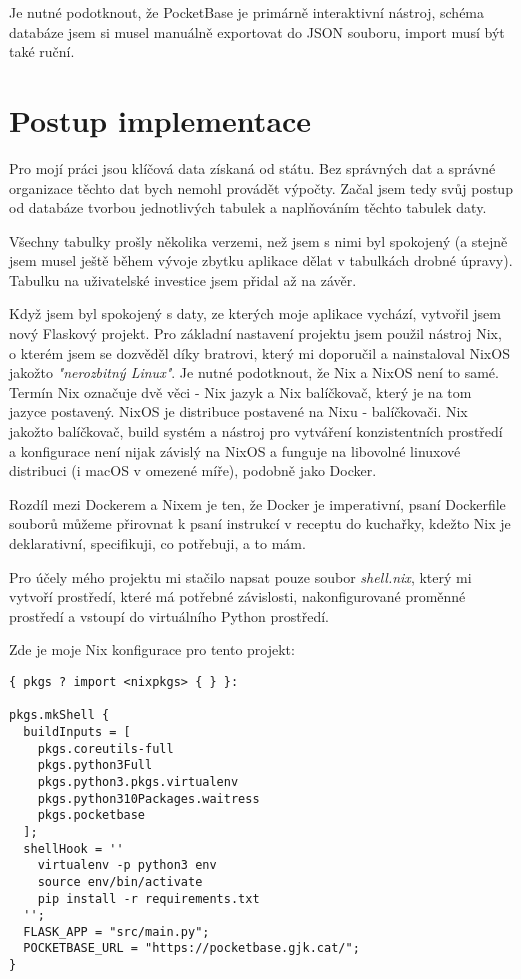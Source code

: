 \documentclass[11pt,a4paper,twoside,openright]{report}
\begin{document}
Je nutné podotknout, že PocketBase je primárně interaktivní nástroj, schéma databáze jsem si musel
manuálně exportovat do JSON souboru, import musí být také ruční.

\section{Postup implementace}

Pro mojí práci jsou klíčová data získaná od státu. Bez správných dat a správné organizace těchto dat
bych nemohl provádět výpočty. Začal jsem tedy svůj postup od databáze tvorbou jednotlivých tabulek
a naplňováním těchto tabulek daty.

Všechny tabulky prošly několika verzemi, než jsem s nimi byl spokojený (a stejně jsem musel ještě
během vývoje zbytku aplikace dělat v tabulkách drobné úpravy). Tabulku na uživatelské investice
jsem přidal až na závěr.

Když jsem byl spokojený s daty, ze kterých moje aplikace vychází, vytvořil jsem nový Flaskový projekt.
Pro základní nastavení projektu jsem použil nástroj Nix, o kterém jsem se dozvěděl díky bratrovi, který
mi doporučil a nainstaloval NixOS jakožto \emph{"nerozbitný Linux"}. Je nutné podotknout, že Nix a NixOS
není to samé. Termín Nix označuje dvě věci - Nix jazyk a Nix balíčkovač, který je na tom jazyce postavený.
NixOS je distribuce postavené na Nixu - balíčkovači. Nix jakožto balíčkovač, build systém a nástroj pro
vytváření konzistentních prostředí a konfigurace není nijak závislý na NixOS a funguje na libovolné
linuxové distribuci (i macOS v omezené míře), podobně jako Docker.

Rozdíl mezi Dockerem a Nixem je ten, že Docker je imperativní, psaní Dockerfile souborů můžeme přirovnat
k psaní instrukcí v receptu do kuchařky, kdežto Nix je deklarativní, specifikuji, co potřebuji, a to mám.

Pro účely mého projektu mi stačilo napsat pouze soubor \emph{shell.nix}, který mi vytvoří prostředí,
které má potřebné závislosti, nakonfigurované proměnné prostředí a vstoupí do virtuálního Python prostředí.

Zde je moje Nix konfigurace pro tento projekt:
\begin{verbatim}
{ pkgs ? import <nixpkgs> { } }:

pkgs.mkShell {
  buildInputs = [
    pkgs.coreutils-full
    pkgs.python3Full
    pkgs.python3.pkgs.virtualenv
    pkgs.python310Packages.waitress
    pkgs.pocketbase
  ];
  shellHook = ''
    virtualenv -p python3 env
    source env/bin/activate
    pip install -r requirements.txt
  '';
  FLASK_APP = "src/main.py";
  POCKETBASE_URL = "https://pocketbase.gjk.cat/";
}
\end{verbatim}
\end{document}
